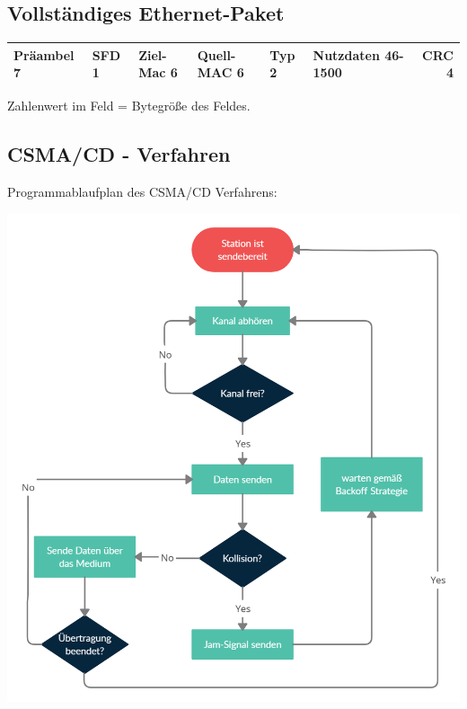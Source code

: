 \documentclass[12pt,a4paper]{article}
\begin{document}
\subsection{Vollständiges Ethernet-Paket}
    \begin{center}
        \renewcommand{\arraystretch}{1.5}
        \begin{tabularx}{17cm}{|l|l|l|X|X|X|r|}
            \hline
            Präambel 7&SFD 1&Ziel-Mac 6&Quell-MAC 6&Typ 2&Nutzdaten 46-1500&CRC 4\\
            \hline
        \end{tabularx}
    \end{center}
    \begin{center}
        Zahlenwert im Feld = Bytegröße des Feldes.
    \end{center}

\subsection{CSMA/CD - Verfahren}
    Programmablaufplan des CSMA/CD Verfahrens:
    \begin{center}
        \includegraphics[scale=0.3]{Bilder/CSMACD.png}
    \end{center}
\end{document}
